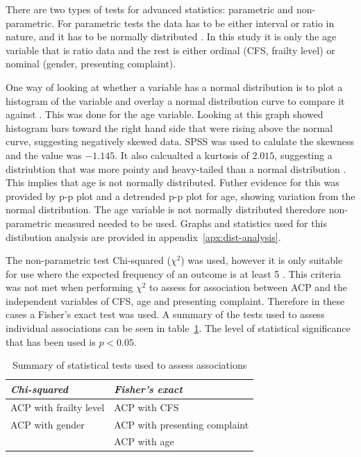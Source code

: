 \documentclass
[
	12pt,
	a4paper,
	oneside,
]{report}
\begin{document}
There are two types of tests for advanced statistics: parametric and
non-parametric. For parametric tests the data has to be either interval or
ratio in nature, and it has to be normally distributed \parencite{parahoo:14}.
In this study it is only the age variable that is ratio data and the rest is 
either ordinal
(CFS, frailty level) or nominal (gender, presenting complaint).

One way of looking at whether a variable has a normal distribution is to plot
a histogram of the variable and overlay a normal distribution curve to 
compare it against \parencite{field:09}. This was done for the age variable. 
Looking at this graph showed histogram bars toward the right hand side that 
were rising above the normal curve, suggesting negatively skewed data. SPSS
was used to calulate the skewness and the value was $-1.145$. It also 
calcualted a kurtosis of $2.015$, suggesting a distriubtion that was more
pointy and heavy-tailed than a normal distribution \parencite{field:09}.
This implies that age is not normally distributed. Futher evidence for this
was provided by p-p plot and a detrended p-p plot for age, showing 
variation from the normal distribution. The age variable is not normally 
distributed theredore non-parametric measured needed to be used. Graphs
and statistics used for this distibution analysis are provided in 
appendix~\ref{apx:dist-analysis}.

The non-parametric test Chi-squared ($\chi^2$) was used, 
however it is only
suitable for use where the expected frequency of an outcome is at least 5
\parencite[page 690]{field:09}. This criteria was not met when performing 
$\chi^2$ to assess for association between ACP and the independent variables 
of CFS, age and presenting complaint. Therefore in these cases a Fisher's exact
test was used. A summary of the tests used to assess individual associations
can be seen in table~\ref{tab:stat-tests}. 
The level of statistical significance that has been used is
$p<0.05$.

\begin{table}[ht]
\centering
\caption{Summary of statistical tests used to assess associations}
\label{tab:stat-tests}
\begin{tabular}{ l l }
\emph{Chi-squared} & \emph{Fisher's exact} \\
\hline
ACP with frailty level & ACP with CFS \\
ACP with gender & ACP with presenting complaint \\
 & ACP with age
\end{tabular}
\end{table}
\end{document}

